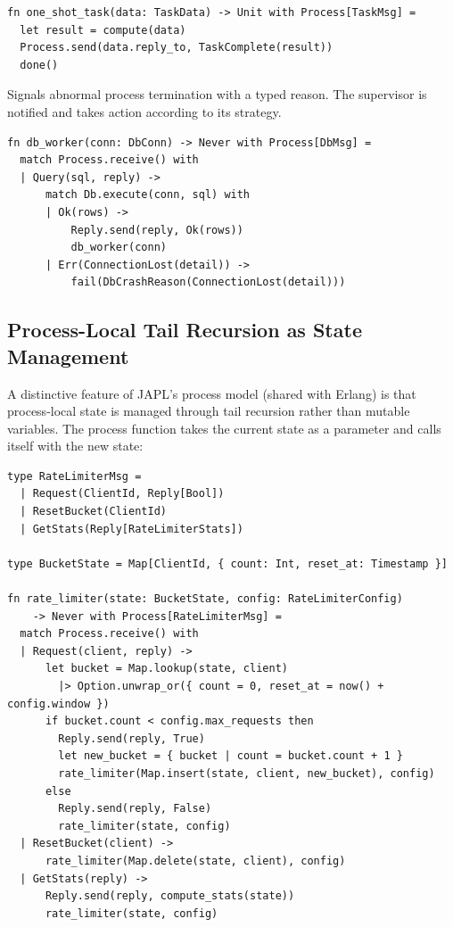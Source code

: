 \documentclass[11pt,a4paper]{article}
\begin{document}
\begin{description}
\begin{lstlisting}[language=japl,caption={Normal process termination}]
fn one_shot_task(data: TaskData) -> Unit with Process[TaskMsg] =
  let result = compute(data)
  Process.send(data.reply_to, TaskComplete(result))
  done()
\end{lstlisting}

\item[\texttt{fail}:] Signals abnormal process termination with a typed reason. The supervisor is notified and takes action according to its strategy.

\begin{lstlisting}[language=japl,caption={Explicit failure with typed reason}]
fn db_worker(conn: DbConn) -> Never with Process[DbMsg] =
  match Process.receive() with
  | Query(sql, reply) ->
      match Db.execute(conn, sql) with
      | Ok(rows) ->
          Reply.send(reply, Ok(rows))
          db_worker(conn)
      | Err(ConnectionLost(detail)) ->
          fail(DbCrashReason(ConnectionLost(detail)))
\end{lstlisting}
\end{description}

\subsection{Process-Local Tail Recursion as State Management}

A distinctive feature of JAPL's process model (shared with Erlang) is that process-local state is managed through tail recursion rather than mutable variables. The process function takes the current state as a parameter and calls itself with the new state:

\begin{lstlisting}[language=japl,caption={State management via tail recursion}]
type RateLimiterMsg =
  | Request(ClientId, Reply[Bool])
  | ResetBucket(ClientId)
  | GetStats(Reply[RateLimiterStats])

type BucketState = Map[ClientId, { count: Int, reset_at: Timestamp }]

fn rate_limiter(state: BucketState, config: RateLimiterConfig)
    -> Never with Process[RateLimiterMsg] =
  match Process.receive() with
  | Request(client, reply) ->
      let bucket = Map.lookup(state, client)
        |> Option.unwrap_or({ count = 0, reset_at = now() + config.window })
      if bucket.count < config.max_requests then
        Reply.send(reply, True)
        let new_bucket = { bucket | count = bucket.count + 1 }
        rate_limiter(Map.insert(state, client, new_bucket), config)
      else
        Reply.send(reply, False)
        rate_limiter(state, config)
  | ResetBucket(client) ->
      rate_limiter(Map.delete(state, client), config)
  | GetStats(reply) ->
      Reply.send(reply, compute_stats(state))
      rate_limiter(state, config)
\end{lstlisting}
\end{document}
